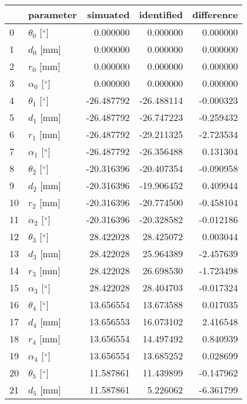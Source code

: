 \documentclass{standalone}%
\begin{document}
%
\normalsize%
\begin{tabular}{llrrr}
\toprule
{} &                 parameter &   simuated & identified & difference \\
\midrule
0  &  $\theta_{0}$ [$\degree$] &   0.000000 &   0.000000 &   0.000000 \\
1  &              $d_{0}$ [mm] &   0.000000 &   0.000000 &   0.000000 \\
2  &              $r_{0}$ [mm] &   0.000000 &   0.000000 &   0.000000 \\
3  &  $\alpha_{0}$ [$\degree$] &   0.000000 &   0.000000 &   0.000000 \\
4  &  $\theta_{1}$ [$\degree$] & -26.487792 & -26.488114 &  -0.000323 \\
5  &              $d_{1}$ [mm] & -26.487792 & -26.747223 &  -0.259432 \\
6  &              $r_{1}$ [mm] & -26.487792 & -29.211325 &  -2.723534 \\
7  &  $\alpha_{1}$ [$\degree$] & -26.487792 & -26.356488 &   0.131304 \\
8  &  $\theta_{2}$ [$\degree$] & -20.316396 & -20.407354 &  -0.090958 \\
9  &              $d_{2}$ [mm] & -20.316396 & -19.906452 &   0.409944 \\
10 &              $r_{2}$ [mm] & -20.316396 & -20.774500 &  -0.458104 \\
11 &  $\alpha_{2}$ [$\degree$] & -20.316396 & -20.328582 &  -0.012186 \\
12 &  $\theta_{3}$ [$\degree$] &  28.422028 &  28.425072 &   0.003044 \\
13 &              $d_{3}$ [mm] &  28.422028 &  25.964389 &  -2.457639 \\
14 &              $r_{3}$ [mm] &  28.422028 &  26.698530 &  -1.723498 \\
15 &  $\alpha_{3}$ [$\degree$] &  28.422028 &  28.404703 &  -0.017324 \\
16 &  $\theta_{4}$ [$\degree$] &  13.656554 &  13.673588 &   0.017035 \\
17 &              $d_{4}$ [mm] &  13.656553 &  16.073102 &   2.416548 \\
18 &              $r_{4}$ [mm] &  13.656554 &  14.497492 &   0.840939 \\
19 &  $\alpha_{4}$ [$\degree$] &  13.656554 &  13.685252 &   0.028699 \\
20 &  $\theta_{5}$ [$\degree$] &  11.587861 &  11.439899 &  -0.147962 \\
21 &              $d_{5}$ [mm] &  11.587861 &   5.226062 &  -6.361799 \\

\end{tabular}
\end{document}
